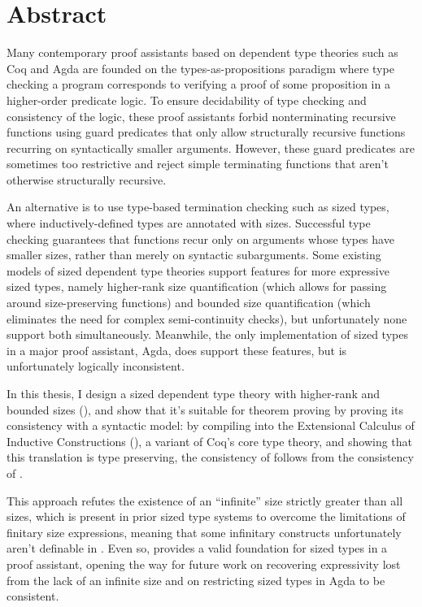 \chapter{Abstract}

Many contemporary proof assistants based on dependent type theories such as Coq and Agda
are founded on the types-as-propositions paradigm where type checking a program
corresponds to verifying a proof of some proposition in a higher-order predicate logic.
To ensure decidability of type checking and consistency of the logic,
these proof assistants forbid nonterminating recursive functions
using guard predicates that only allow structurally recursive functions
recurring on syntactically smaller arguments.
However, these guard predicates are sometimes too restrictive
and reject simple terminating functions that aren't otherwise structurally recursive.

An alternative is to use type-based termination checking such as sized types,
where inductively-defined types are annotated with sizes.
Successful type checking guarantees that functions recur only on arguments whose types have smaller sizes,
rather than merely on syntactic subarguments.
Some existing models of sized dependent type theories
support features for more expressive sized types,
namely higher-rank size quantification
(which allows for passing around size-preserving functions)
and bounded size quantification
(which eliminates the need for complex semi-continuity checks),
but unfortunately none support both simultaneously.
Meanwhile, the only implementation of sized types in a major proof assistant, Agda,
does support these features, but is unfortunately logically inconsistent.

In this thesis, I design a sized dependent type theory with higher-rank and bounded sizes (\lang),
and show that it's suitable for theorem proving by proving its consistency with a syntactic model:
by compiling \lang into the Extensional Calculus of Inductive Constructions (\CICE),
a variant of Coq's core type theory,
and showing that this translation is type preserving,
the consistency of \lang follows from the consistency of \CICE.

This approach refutes the existence of an ``infinite'' size strictly greater than all sizes,
which is present in prior sized type systems to overcome the limitations of finitary size expressions,
meaning that some infinitary constructs unfortunately aren't definable in \lang.
Even so, \lang provides a valid foundation for sized types in a proof assistant,
opening the way for future work on recovering expressivity lost from the lack of an infinite size
and on restricting sized types in Agda to be consistent.